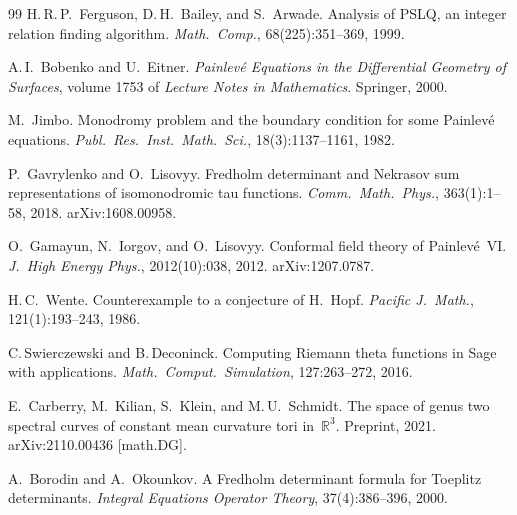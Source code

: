 \documentclass[11pt,a4paper]{article}
\theoremstyle{plain}
\theoremstyle{definition}
\theoremstyle{remark}
\begin{document}
\begin{thebibliography}{99}
H.\,R.\,P.~Ferguson, D.\,H.~Bailey, and S.~Arwade.
\newblock Analysis of PSLQ, an integer relation finding algorithm.
\newblock \emph{Math.\ Comp.}, 68(225):351--369, 1999.

A.\,I.~Bobenko and U.~Eitner.
\newblock \emph{Painlev\'e Equations in the Differential Geometry of
  Surfaces}, volume 1753 of \emph{Lecture Notes in Mathematics}.
\newblock Springer, 2000.

M.~Jimbo.
\newblock Monodromy problem and the boundary condition for some
  Painlev\'e equations.
\newblock \emph{Publ.\ Res.\ Inst.\ Math.\ Sci.}, 18(3):1137--1161, 1982.

P.~Gavrylenko and O.~Lisovyy.
\newblock Fredholm determinant and Nekrasov sum representations of
  isomonodromic tau functions.
\newblock \emph{Comm.\ Math.\ Phys.}, 363(1):1--58, 2018.
\newblock arXiv:1608.00958.

O.~Gamayun, N.~Iorgov, and O.~Lisovyy.
\newblock Conformal field theory of Painlev\'e~VI.
\newblock \emph{J.\ High Energy Phys.}, 2012(10):038, 2012.
\newblock arXiv:1207.0787.

H.\,C.~Wente.
\newblock Counterexample to a conjecture of H.~Hopf.
\newblock \emph{Pacific J.\ Math.}, 121(1):193--243, 1986.

C.\,Swierczewski and B.\,Deconinck.
\newblock Computing Riemann theta functions in Sage with applications.
\newblock \emph{Math.\ Comput.\ Simulation}, 127:263--272, 2016.

E.~Carberry, M.~Kilian, S.~Klein, and M.\,U.~Schmidt.
\newblock The space of genus two spectral curves of constant mean curvature
  tori in~$\mathbb{R}^3$.
\newblock Preprint, 2021.
\newblock arXiv:2110.00436 [math.DG].

A.~Borodin and A.~Okounkov.
\newblock A Fredholm determinant formula for Toeplitz determinants.
\newblock \emph{Integral Equations Operator Theory}, 37(4):386--396, 2000.

\end{thebibliography}
\end{document}
